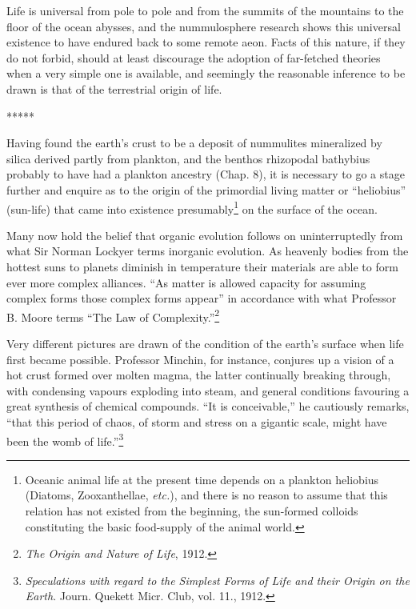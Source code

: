 \documentclass[a4paper, 12pt, oneside]{article}
\begin{document}
Life is universal from pole to pole and from the summits of the mountains to the floor of the ocean abysses, and the nummulosphere research shows this universal existence to have endured back to some remote aeon. Facts of this nature, if they do not forbid, should at least discourage the adoption of far-fetched theories when a very simple one is available, and seemingly the reasonable inference to be drawn is that of the terrestrial origin of life.

\centerline{*\hspace{15mm}*\hspace{15mm}*\hspace{15mm}*\hspace{15mm}*}
\bigskip

Having found the earth's crust to be a deposit of nummulites mineralized by silica derived partly from plankton, and the benthos rhizopodal bathybius probably to have had a plankton ancestry (Chap. 8), it is necessary to go a stage further and enquire as to the origin of the primordial living matter or ``heliobius'' (sun-life) that came into existence presumably\footnote{Oceanic animal life at the present time depends on a plankton heliobius (Diatoms, Zooxanthellae, \emph{etc.}), and there is no reason to assume that this relation has not existed from the beginning, the sun-formed colloids constituting the basic food-supply of the animal world.} on the surface of the ocean.

Many now hold the belief that organic evolution follows on uninterruptedly from what Sir Norman Lockyer terms inorganic evolution. As heavenly bodies from the hottest suns to planets diminish in temperature their materials are able to form ever more complex alliances. ``As matter is allowed capacity for assuming complex forms those complex forms appear'' in accordance with what Professor B. Moore terms ``The Law of Complexity.''\footnote{\emph{The Origin and Nature of Life}, 1912.}

Very different pictures are drawn of the condition of the earth's surface when life first became possible. Professor Minchin, for instance, conjures up a vision of a hot crust formed over molten magma, the latter continually breaking through, with condensing vapours exploding into steam, and general conditions favouring a great synthesis of chemical compounds. ``It is conceivable,'' he cautiously remarks, ``that this period of chaos, of storm and stress on a gigantic scale, might have been the womb of life.''\footnote{\emph{Speculations with regard to the Simplest Forms of Life and their Origin on the Earth}. Journ. Quekett Micr. Club, vol. 11., 1912.}
\end{document}
